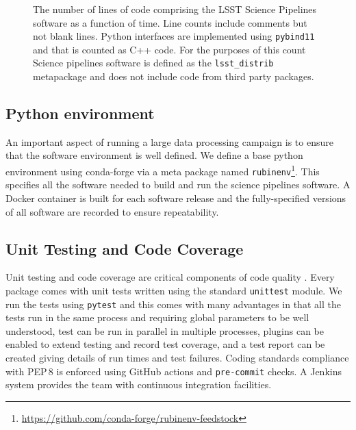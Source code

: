 \begin{figure}
\caption{The number of lines of code comprising the LSST Science Pipelines software as a function of time.
Line counts include comments but not blank lines. Python interfaces are implemented using \texttt{pybind11} and that is counted as C++ code. For the purposes of this count Science pipelines software is defined as the \texttt{lsst\_distrib} metapackage and does not include code from third party packages.}
\label{fig:pipe-loc}
\end{figure}

\subsection{Python environment}

An important aspect of running a large data processing campaign is to ensure that the software environment is well defined.
We define a base python environment using conda-forge via a meta package named \texttt{rubinenv}\footnote{\url{https://github.com/conda-forge/rubinenv-feedstock}}.
This specifies all the software needed to build and run the science pipelines software.
A Docker container is built for each software release and the fully-specified versions of all software are recorded to ensure repeatability.

\subsection{Unit Testing and Code Coverage}

Unit testing and code coverage are critical components of code quality \citep{2018SPIE10707E..09J}.
Every package comes with unit tests written using the standard \texttt{unittest} module.
We run the tests using \texttt{pytest} \citep{pytest} and this comes with many advantages in that all the tests run in the same process and requiring global parameters to be well understood, test can be run in parallel in multiple processes, plugins can be enabled to extend testing and record test coverage, and a test report can be created giving details of run times and test failures.
Coding standards compliance with PEP\,8 \citep{pep8} is enforced using GitHub actions and \texttt{pre-commit} checks.
A Jenkins system provides the team with continuous integration facilities.
